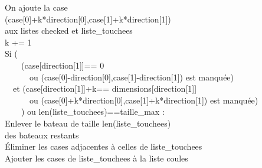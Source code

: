 {\begin{frame}[allowframebreaks]
On ajoute la case\\
 (case[0]+k*direction[0],case[1]+k*direction[1])\\
aux listes checked et liste\_touchees\\
k += 1\\
\framebreak
{}Si (\\
\ \ \ \ (case[direction[1]]== 0 \\
\ \ \ \ \ \ ou (case[0]-direction[0],case[1]-direction[1]) est manquée)\\
\ \ et (case[direction[1]]+k== dimensions[direction[1]] \\
\ \ \ \ \ \ ou (case[0]+k*direction[0],case[1]+k*direction[1]) est manquée)\\
\ \ \ \ ) ou len(liste\_touchees)==taille\_max :\\
Enlever le bateau de taille len(liste\_touchees)\\
des bateaux restants\\
Éliminer les cases adjacentes à celles de liste\_touchees\\
Ajouter les cases de liste\_touchees à la liste coules\\
\end{frame}
}

